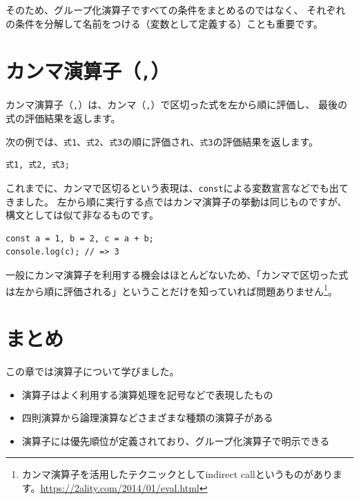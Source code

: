 そのため、グループ化演算子ですべての条件をまとめるのではなく、
それぞれの条件を分解して名前をつける（変数として定義する）ことも重要です。

\hypertarget{comma-operator}{%
\section{\texorpdfstring{カンマ演算子（\texttt{,}）}{カンマ演算子（,）}}\label{comma-operator}}

カンマ演算子（\texttt{,}）は、カンマ（\texttt{,}）で区切った式を左から順に評価し、
最後の式の評価結果を返します。

次の例では、\texttt{式1}、\texttt{式2}、\texttt{式3}の順に評価され、\texttt{式3}の評価結果を返します。

\begin{lstlisting}
式1, 式2, 式3;
\end{lstlisting}

これまでに、カンマで区切るという表現は、\texttt{const}による変数宣言などでも出てきました。
左から順に実行する点ではカンマ演算子の挙動は同じものですが、構文としては似て非なるものです。

\begin{lstlisting}
const a = 1, b = 2, c = a + b;
console.log(c); // => 3
\end{lstlisting}

一般にカンマ演算子を利用する機会はほとんどないため、「カンマで区切った式は左から順に評価される」ということだけを知っていれば問題ありません\footnote{カンマ演算子を活用したテクニックとしてindirect
  callというものがあります。\url{https://2ality.com/2014/01/eval.html}}。

\hypertarget{conclusion}{%
\section{まとめ}\label{conclusion}}

この章では演算子について学びました。

\begin{itemize}
\item
  演算子はよく利用する演算処理を記号などで表現したもの
\item
  四則演算から論理演算などさまざまな種類の演算子がある
\item
  演算子には優先順位が定義されており、グループ化演算子で明示できる
\end{itemize}
